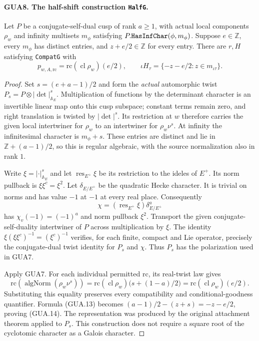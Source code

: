 \documentclass[11pt,a4paper]{article}
\numberwithin{equation}{section}
\theoremstyle{remark}\newtheorem{remark}[theorem]{Remark}
\begin{document}
\paragraph{GUA8. The half-shift construction \texttt{Half\allowbreak G}.}
\label{claim:GUA8}
Let $P$ be a conjugate-self-dual cusp of rank $a\geq1$,
with actual local components $\rho_w$ and infinity
multisets $m_\phi$ satisfying $P.\texttt{Has\allowbreak Inf\allowbreak Char}(\phi,m_\phi)$.
Suppose $e\in\mathbb Z$, every $m_\phi$ has distinct
entries, and $z+e/2\in\mathbb Z$ for every entry.
There are $r,H$ satisfying \texttt{Compat\allowbreak G} with
\[
       p_{w,A,\mathrm{rc}}
                       =\mathrm{rc}(\operatorname{cl}\rho_w)(e/2),
       \qquad
       \iota H_\tau=\{-z-e/2:z\in m_{\iota\tau}\}.
                                                        \tag{GUA.14}
\]
\begin{proof}
Set $s=(e+a-1)/2$ and form the \emph{actual}
automorphic twist $P_s=P\otimes|\det|_{\mathbb A_E}^{s}$.
Multiplication of functions by the determinant character
is an invertible linear map onto this cusp subspace;
constant terms remain zero, and right translation is
twisted by $|\det|^s$.  Its restriction at $w$ therefore
carries the given local intertwiner for $\rho_w$ to
an intertwiner for $\rho_w\nu^s$.  At infinity the
infinitesimal character is $m_\phi+s$.  These entries
are distinct and lie in $\mathbb Z+(a-1)/2$, so this
is regular algebraic, with the source normalization
also in rank $1$.

Write $\xi=|\cdot|_{\mathbb A_E}^{s}$ and let
$\operatorname{res}_{E^+}\xi$ be its restriction to
the ideles of $E^+$.  Its norm pullback is
$\xi\xi^c=\xi^2$.  Let $\delta_{E/E^+}$ be the
quadratic Hecke character.  It is trivial on norms
and has value $-1$ at $-1$ at every real place.
Consequently
\[
        \chi=(\operatorname{res}_{E^+}\xi)
                                  \delta_{E/E^+}^{a}
\]
has $\chi_v(-1)=(-1)^a$ and norm pullback $\xi^2$.
Transport the given conjugate-self-duality intertwiner
of $P$ across multiplication by $\xi$.  The identity
$\xi(\xi\xi^c)^{-1}=(\xi^c)^{-1}$ verifies, for
each finite, compact and Lie operator, precisely the
conjugate-dual twist identity for $P_s$ and $\chi$.
Thus $P_s$ has the polarization used in GUA7.

Apply GUA7.  For each individual permitted $\mathrm{rc}$,
its real-twist law gives
\[
 \mathrm{rc}(\operatorname{algNorm}(\rho_w\nu^s))
  =\mathrm{rc}(\operatorname{cl}\rho_w)
                       \bigl(s+(1-a)/2\bigr)
  =\mathrm{rc}(\operatorname{cl}\rho_w)(e/2).
\]
Substituting this equality preserves every compatibility
and conditional-goodness quantifier.  Formula (GUA.13)
becomes $(a-1)/2-(z+s)=-z-e/2$, proving (GUA.14).
The representation was produced by the original
attachment theorem applied to $P_s$.  This construction
does not require a square root of the cyclotomic
character as a Galois character.
\end{proof}
\end{document}
